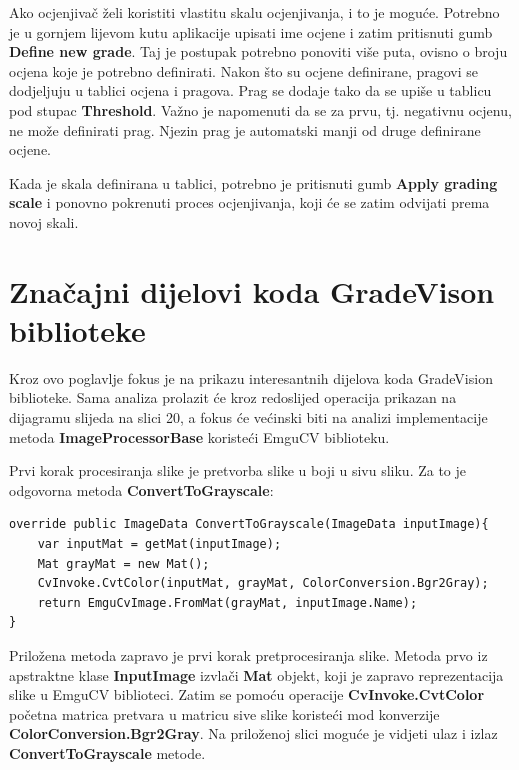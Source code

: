 \documentclass{foi}
\begin{document}
Ako ocjenjivač želi koristiti vlastitu skalu ocjenjivanja, i to je moguće. Potrebno je u gornjem lijevom kutu aplikacije upisati ime ocjene i zatim pritisnuti gumb \textbf{Define new grade}. Taj je postupak potrebno ponoviti više puta, ovisno o broju ocjena koje je potrebno definirati. Nakon što su ocjene definirane, pragovi se dodjeljuju u tablici ocjena i pragova. Prag se dodaje tako da se upiše u tablicu pod stupac \textbf{Threshold}. Važno je napomenuti da se za prvu, tj. negativnu ocjenu, ne može definirati prag. Njezin prag je automatski manji od druge definirane ocjene.

Kada je skala definirana u tablici, potrebno je pritisnuti gumb \textbf{Apply grading scale} i ponovno pokrenuti proces ocjenjivanja, koji će se zatim odvijati prema novoj skali.

\section{Značajni dijelovi koda GradeVison biblioteke}

Kroz ovo poglavlje fokus je na prikazu interesantnih dijelova koda GradeVision biblioteke. Sama analiza prolazit će kroz redoslijed operacija prikazan na dijagramu slijeda na slici 20, a fokus će većinski biti na analizi implementacije metoda \textbf{ImageProcessorBase} koristeći EmguCV biblioteku.

Prvi korak procesiranja slike je pretvorba slike u boji u sivu sliku. Za to je odgovorna metoda \textbf{ConvertToGrayscale}:

\begin{lstlisting}[caption={Metoda za konverziju slike u boji u sivu sliku}]
override public ImageData ConvertToGrayscale(ImageData inputImage){
    var inputMat = getMat(inputImage);
    Mat grayMat = new Mat();
    CvInvoke.CvtColor(inputMat, grayMat, ColorConversion.Bgr2Gray);
    return EmguCvImage.FromMat(grayMat, inputImage.Name);
}
\end{lstlisting} 

Priložena metoda zapravo je prvi korak pretprocesiranja slike. Metoda prvo iz apstraktne klase \textbf{InputImage} izvlači \textbf{Mat} objekt, koji je zapravo reprezentacija slike u EmguCV biblioteci. Zatim se pomoću operacije \textbf{CvInvoke.CvtColor} početna matrica pretvara u matricu sive slike koristeći mod konverzije \textbf{ColorConversion.Bgr2Gray}. Na priloženoj slici moguće je vidjeti ulaz i izlaz \textbf{ConvertToGrayscale} metode.
\end{document}
